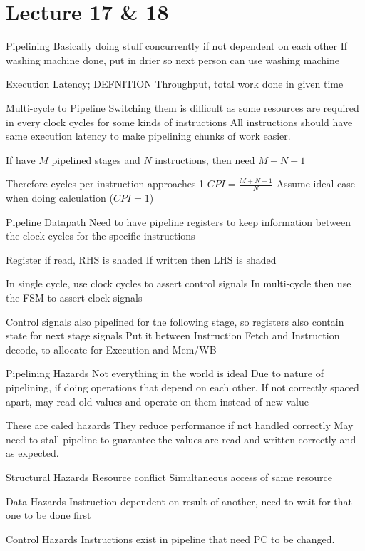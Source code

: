 \documentclass{article}
\begin{document}
\section{Lecture 17 \& 18}
	Pipelining
		Basically doing stuff concurrently if not dependent on each other
		If washing machine done, put in drier so next person can use washing machine

		Execution Latency; DEFNITION
		Throughput, total work done in given time

	Multi-cycle to Pipeline
		Switching them is difficult as some resources are required in every clock cycles for some kinds of instructions
		All instructions should have same execution latency to make pipelining chunks of work easier.

		If have $M$ pipelined stages and $N$ instructions, then need $M + N - 1$

		Therefore cycles per instruction approaches 1
		$CPI = \frac{M + N - 1}{N}$
		Assume ideal case when doing calculation ($CPI = 1$)

	Pipeline Datapath
		Need to have pipeline registers to keep information between the clock cycles for the specific instructions

		Register if read, RHS is shaded
		If written then LHS is shaded

		In single cycle, use clock cycles to assert control signals
		In multi-cycle then use the FSM to assert clock signals

		Control signals also pipelined for the following stage, so registers also contain state for next stage signals
		Put it between Instruction Fetch and Instruction decode, to allocate for Execution and Mem/WB

	Pipelining Hazards
		Not everything in the world is ideal
		Due to nature of pipelining, if doing operations that depend on each other. If not correctly spaced apart, may read old values and operate on them instead of new value

		These are caled hazards
		They reduce performance if not handled correctly
		May need to stall pipeline to guarantee the values are read and written correctly and as expected.


		Structural Hazards
			Resource conflict
			Simultaneous access of same resource

		Data Hazards
			Instruction dependent on result of another, need to wait for that one to be done first

		Control Hazards
			Instructions exist in pipeline that need PC to be changed.
\end{document}
